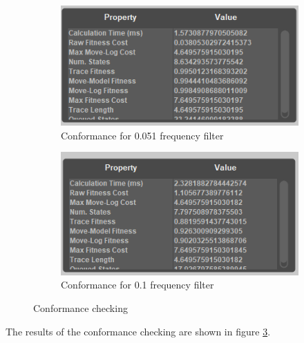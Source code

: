 \begin{figure}[!htbp]
\centering
\begin{subfigure}{.25\textwidth}
  \centering
  \includegraphics[width=\linewidth]{App_Conformance0-051.PNG}
  \caption{Conformance for 0.051 frequency filter}
  \label{fig:APP_Conf0-051}
\end{subfigure}%
\begin{subfigure}{.25\textwidth}
  \centering
  \includegraphics[width=\linewidth]{App_Conformance0-1.PNG}
  \caption{Conformance for 0.1 frequency filter}
  \label{fig:APP_Conf0-1}
\end{subfigure}
\caption{Conformance checking}
\label{fig:App_Conf}
\end{figure}


The results of the conformance checking are shown in figure \ref{fig:App_Conf}.

